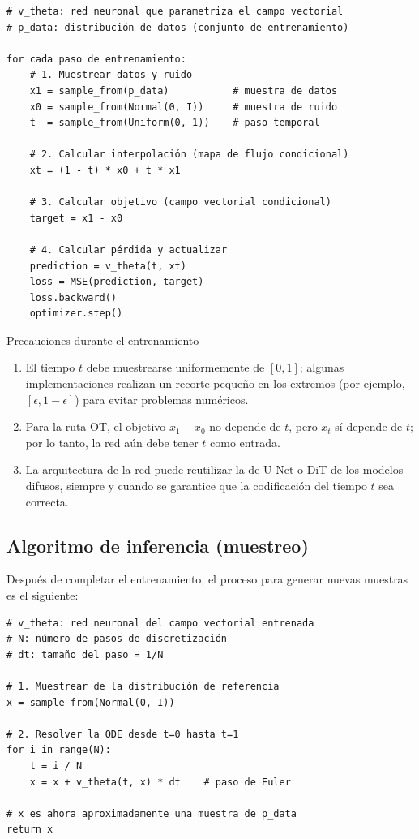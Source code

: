 \documentclass[a4paper]{article}
\begin{document}
\begin{lstlisting}[caption={Algoritmo de entrenamiento de Conditional Flow Matching (ruta OT)}]
# v_theta: red neuronal que parametriza el campo vectorial
# p_data: distribución de datos (conjunto de entrenamiento)

for cada paso de entrenamiento:
    # 1. Muestrear datos y ruido
    x1 = sample_from(p_data)           # muestra de datos
    x0 = sample_from(Normal(0, I))     # muestra de ruido
    t  = sample_from(Uniform(0, 1))    # paso temporal

    # 2. Calcular interpolación (mapa de flujo condicional)
    xt = (1 - t) * x0 + t * x1

    # 3. Calcular objetivo (campo vectorial condicional)
    target = x1 - x0

    # 4. Calcular pérdida y actualizar
    prediction = v_theta(t, xt)
    loss = MSE(prediction, target)
    loss.backward()
    optimizer.step()
\end{lstlisting}

\begin{warningbox}{Precauciones durante el entrenamiento}
\begin{enumerate}
    \item El tiempo $t$ debe muestrearse uniformemente de $[0, 1]$; algunas implementaciones realizan un recorte pequeño en los extremos (por ejemplo, $[\epsilon, 1-\epsilon]$) para evitar problemas numéricos.
    \item Para la ruta OT, el objetivo $x_1 - x_0$ no depende de $t$, pero $x_t$ sí depende de $t$; por lo tanto, la red aún debe tener $t$ como entrada.
    \item La arquitectura de la red puede reutilizar la de U-Net o DiT de los modelos difusos, siempre y cuando se garantice que la codificación del tiempo $t$ sea correcta.
\end{enumerate}
\end{warningbox}

\subsection{Algoritmo de inferencia (muestreo)}

Después de completar el entrenamiento, el proceso para generar nuevas muestras es el siguiente:

\begin{lstlisting}[caption={Algoritmo de muestreo de Flow Matching (método Euler)}]
# v_theta: red neuronal del campo vectorial entrenada
# N: número de pasos de discretización
# dt: tamaño del paso = 1/N

# 1. Muestrear de la distribución de referencia
x = sample_from(Normal(0, I))

# 2. Resolver la ODE desde t=0 hasta t=1
for i in range(N):
    t = i / N
    x = x + v_theta(t, x) * dt    # paso de Euler

# x es ahora aproximadamente una muestra de p_data
return x
\end{lstlisting}
\end{document}
